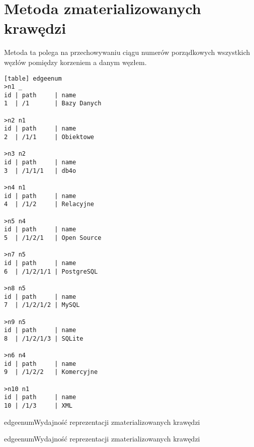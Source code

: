 \section{Metoda zmaterializowanych krawędzi}

Metoda ta polega na przechowywaniu ciągu numerów porządkowych wszystkich węzłów pomiędzy korzeniem a danym węzłem.



\begin{verbatim}[table] edgeenum
>n1 _
id | path     | name
1  | /1       | Bazy Danych

>n2 n1
id | path     | name
2  | /1/1     | Obiektowe

>n3 n2
id | path     | name
3  | /1/1/1   | db4o

>n4 n1
id | path     | name
4  | /1/2     | Relacyjne

>n5 n4
id | path     | name
5  | /1/2/1   | Open Source

>n7 n5
id | path     | name
6  | /1/2/1/1 | PostgreSQL

>n8 n5
id | path     | name
7  | /1/2/1/2 | MySQL

>n9 n5
id | path     | name
8  | /1/2/1/3 | SQLite

>n6 n4
id | path     | name
9  | /1/2/2   | Komercyjne

>n10 n1
id | path     | name
10 | /1/3     | XML

\end{verbatim}












\begin{qxtab}{edgeenum}{Wydajność reprezentacji zmaterializowanych krawędzi}
\end{qxtab}

\begin{qxfig}{edgeenum}{Wydajność reprezentacji zmaterializowanych krawędzi}
\end{qxfig}



